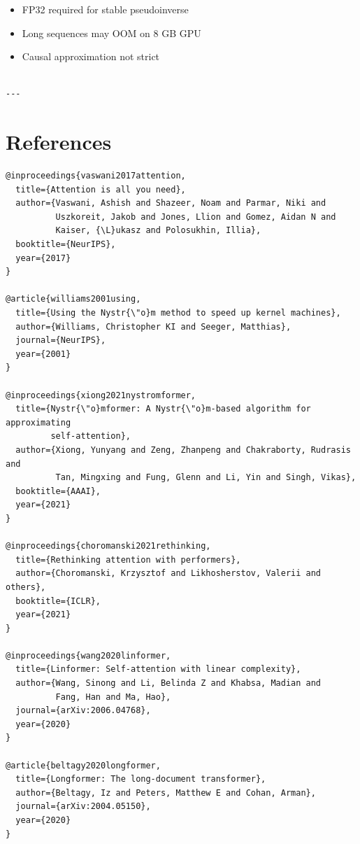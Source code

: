 \begin{itemize}
\item FP32 required for stable pseudoinverse
\item Long sequences may OOM on 8 GB GPU
\item Causal approximation not strict
\end{itemize}
\begin{lstlisting}

---
\end{lstlisting}


\section{References}

\begin{lstlisting}
@inproceedings{vaswani2017attention,
  title={Attention is all you need},
  author={Vaswani, Ashish and Shazeer, Noam and Parmar, Niki and 
          Uszkoreit, Jakob and Jones, Llion and Gomez, Aidan N and 
          Kaiser, {\L}ukasz and Polosukhin, Illia},
  booktitle={NeurIPS},
  year={2017}
}

@article{williams2001using,
  title={Using the Nystr{\"o}m method to speed up kernel machines},
  author={Williams, Christopher KI and Seeger, Matthias},
  journal={NeurIPS},
  year={2001}
}

@inproceedings{xiong2021nystromformer,
  title={Nystr{\"o}mformer: A Nystr{\"o}m-based algorithm for approximating 
         self-attention},
  author={Xiong, Yunyang and Zeng, Zhanpeng and Chakraborty, Rudrasis and 
          Tan, Mingxing and Fung, Glenn and Li, Yin and Singh, Vikas},
  booktitle={AAAI},
  year={2021}
}

@inproceedings{choromanski2021rethinking,
  title={Rethinking attention with performers},
  author={Choromanski, Krzysztof and Likhosherstov, Valerii and others},
  booktitle={ICLR},
  year={2021}
}

@inproceedings{wang2020linformer,
  title={Linformer: Self-attention with linear complexity},
  author={Wang, Sinong and Li, Belinda Z and Khabsa, Madian and 
          Fang, Han and Ma, Hao},
  journal={arXiv:2006.04768},
  year={2020}
}

@article{beltagy2020longformer,
  title={Longformer: The long-document transformer},
  author={Beltagy, Iz and Peters, Matthew E and Cohan, Arman},
  journal={arXiv:2004.05150},
  year={2020}
}


\end{lstlisting}
